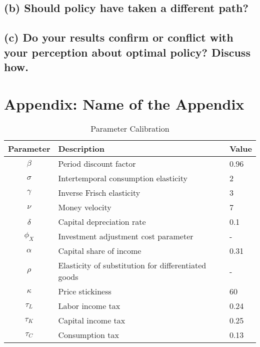 \documentclass[12pt]{article}
\begin{document}
\subsection*{(b) Should policy have taken a different path?}

\subsection*{(c) Do your results confirm or conflict with your perception about optimal policy? Discuss how.}

\newpage %
\printbibliography %

\newpage
\appendix
\section{Appendix: Name of the Appendix}
\begin{table}[ht]
    \centering
    \caption{Parameter Calibration}
    \begin{tabular}{cll}
        \toprule
        Parameter & Description & Value  \\ \midrule
        $\beta$ & Period discount factor  & 0.96  \\
        $\sigma$ & Intertemporal consumption elasticity  & 2  \\
        $\gamma$ & Inverse Frisch elasticity  & 3  \\
        $\nu$ & Money velocity  & 7  \\
        $\delta$ & Capital depreciation rate  & 0.1  \\
        $\phi_X$ & Investment adjustment cost parameter & -  \\
        $\alpha$ & Capital share of income & 0.31  \\
        $\rho$ & Elasticity of substitution for differentiated goods &  -  \\
        $\kappa$ & Price stickiness & 60 \\
        ${\tau_L}$ & Labor income tax & 0.24 \\
        ${\tau_K}$ & Capital income tax & 0.25 \\
        ${\tau_C}$ & Consumption tax & 0.13 \\
    \bottomrule
    \end{tabular}
    \label{tab:parameters}
\end{table}
\end{document}
